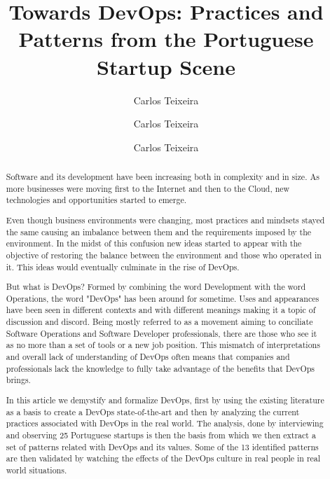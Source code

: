 \documentclass[runningheads,a4paper]{llncs}
\begin{document}


\title{Towards DevOps: Practices and Patterns from the Portuguese Startup Scene}

\author{Carlos Teixeira}
\author{Carlos Teixeira}
\author{Carlos Teixeira}

%
			
\maketitle

\begin{abstract}

Software and its development have been increasing both in complexity and in size. As more businesses were moving first to the Internet and then to the Cloud, new technologies and opportunities started to emerge. 

Even though business environments were changing, most practices and mindsets stayed the same causing an imbalance between them and the requirements imposed by the environment. In the midst of this confusion new ideas started to appear with the objective of restoring the balance between the environment and those who operated in it. This ideas would eventually culminate in the rise of DevOps.

But what is DevOps? Formed by combining the word Development with the word Operations, the word  "DevOps" has been around for sometime. Uses and appearances have been seen in different contexts and with different meanings making it a topic of discussion and discord. Being mostly referred to as a movement aiming to conciliate Software Operations and Software Developer professionals, there are those who see it as no more than a set of tools or a new job position. This mismatch of interpretations and overall lack of understanding of DevOps often means that companies and professionals lack the knowledge to fully take advantage of the benefits that DevOps brings. 

In this article we demystify and formalize DevOps, first by using the existing literature as a basis to create a DevOps state-of-the-art and then by analyzing the current practices associated with DevOps in the real world. The analysis, done by interviewing and observing 25 Portuguese startups is then the basis from which we then extract a set of patterns related with DevOps and its values. Some of the 13 identified patterns are then validated by watching the effects of the DevOps culture in real people in real world situations.

\end{abstract}
\end{document}
